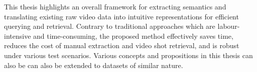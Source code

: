 This thesis highlights an overall framework for extracting semantics and translating existing raw video data into %
intuitive representations for 
efficient querying and retrieval.
Contrary to traditional approaches which are labour-intensive and time-consuming, the proposed method effectively saves time, reduces the cost of manual extraction and video shot retrieval, 
and is robust under various test scenarios. 
Various concepts and propositions in this thesis can also be can also be extended to datasets of similar nature.


